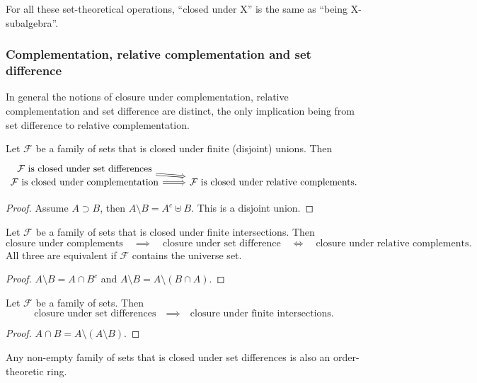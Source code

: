 For all these set-theoretical operations, ``closed under X'' is the same as ``being X-subalgebra''.

\subsubsection{Complementation, relative complementation and set difference}
In general the notions of closure under complementation, relative complementation and set difference are distinct, the only implication being from set difference to relative complementation.

\begin{lemma} \label{complementTypesUnionClosure}
Let $\mathcal{F}$ be a family of sets that is closed under finite (disjoint) unions. Then
\[ \begin{tikzcd}[row sep=0]
\text{$\mathcal{F}$ is closed under set differences} \arrow[dr, Rightarrow] & \\
\text{$\mathcal{F}$ is closed under complementation} \arrow[r,Rightarrow] & \text{$\mathcal{F}$ is closed under relative complements.}
\end{tikzcd} \]
\end{lemma}
\begin{proof}
Assume $A\supset B$, then $A\setminus B = A^c \uplus B$. This is a disjoint union.
\end{proof}

\begin{lemma}
Let $\mathcal{F}$ be a family of sets that is closed under finite intersections. Then
\[ \text{closure under complements} \quad\implies\quad \text{closure under set difference} \quad\iff\quad \text{closure under relative complements.} \]
All three are equivalent if $\mathcal{F}$ contains the universe set.
\end{lemma}
\begin{proof}
$A\setminus B = A\cap B^c$ and $A\setminus B = A\setminus (B\cap A)$.
\end{proof}

\begin{lemma} \label{closureSetDifference}
Let $\mathcal{F}$ be a family of sets. Then
\[ \text{closure under set differences} \quad\implies\quad \text{closure under finite intersections.} \]
\end{lemma}
\begin{proof}
$A\cap B = A\setminus (A\setminus B)$.
\end{proof}

Any non-empty family of sets that is closed under set differences is also an order-theoretic ring.

